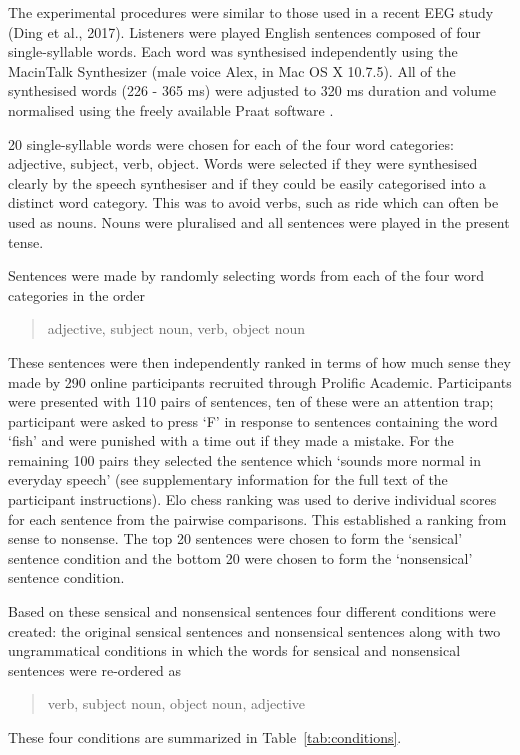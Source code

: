 \documentclass[a4paper,10pt,twoside]{article}
\begin{document}
The experimental procedures were similar to those used in a recent EEG
study (Ding et al., 2017). Listeners were played English sentences
composed of four single-syllable words. Each word was synthesised
independently using the MacinTalk Synthesizer (male voice Alex, in Mac
OS X 10.7.5). All of the synthesised words (226 - 365 ms) were
adjusted to 320 ms duration and volume normalised using the freely
available Praat software \cite{BoersmaWeenink2018}.

20 single-syllable words were chosen for each of the four word
categories: adjective, subject, verb, object. Words were selected if
they were synthesised clearly by the speech synthesiser and if they
could be easily categorised into a distinct word category.  This was
to avoid verbs, such as ride which can
often be used as nouns. Nouns were pluralised and all sentences were
played in the present tense.

Sentences were made by randomly selecting words from each of the four
word categories in the order 
\begin{quote}
adjective, subject noun, verb, object noun
\end{quote}
These sentences were then independently ranked in terms of how
much sense they made by 290 online participants recruited through
Prolific Academic. Participants were presented with 110 pairs of
sentences, ten of these were an attention trap; participant were asked
to press \lq{F}\rq{} in response to sentences containing the word
\lq{}fish\rq{} and were punished with a time out if they made a
mistake. For the remaining 100 pairs they selected the sentence which
\lq{}sounds more normal in everyday speech\rq{} (see supplementary
information for the full text of the participant instructions). Elo
chess ranking \cite{Elo1978} was used to derive individual scores for
each sentence from the pairwise comparisons. This established a
ranking from sense to nonsense. The top 20 sentences were chosen to form the
\lq{}sensical\rq{} sentence condition and the bottom 20 were chosen to form the \lq{}nonsensical\rq{}
sentence condition. 

Based on these sensical and nonsensical sentences four different conditions were created: the
original sensical sentences and nonsensical sentences along with two ungrammatical conditions in which the words for sensical and nonsensical sentences were re-ordered as
\begin{quote}
     verb, subject noun, object noun, adjective
\end{quote}
These four conditions are summarized in Table~\ref{tab:conditions}.
\end{document}
